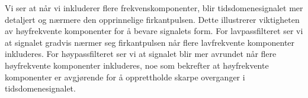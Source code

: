 Vi ser at når vi inkluderer flere frekvenskomponenter, blir tidsdomenesignalet mer detaljert og nærmere den opprinnelige firkantpulsen. Dette illustrerer viktigheten av høyfrekvente komponenter for å bevare signalets form. For lavpassfilteret ser vi at signalet gradvis nærmer seg firkantpulsen når flere lavfrekvente komponenter inkluderes. For høypassfilteret ser vi at signalet blir mer avrundet når flere høyfrekvente komponenter inkluderes, noe som bekrefter at høyfrekvente komponenter er avgjørende for å opprettholde skarpe overganger i tidsdomenesignalet.
\clearpage


